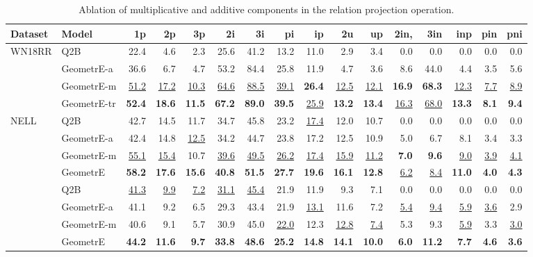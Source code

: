 \documentclass[runningheads]{llncs}
\newcommand{\f}[1]{\textbf{#1}}
\newcommand{\s}[1]{\underline{#1}}
\newcommand{\method}{GeometrE}
\begin{document}
\begin{table}[tbp]
  \centering
  \caption{Ablation of multiplicative and additive components in the
    relation projection operation.}
\begin{adjustbox}{width=0.99\textwidth}
  \begin{tabular}{llrrrrrrrrrrrrrr}
    \toprule
    Dataset                 & Model            &1p          &2p          &3p          & 2i & 3i & pi & ip          & 2u & up & 2in, &3in & inp & pin & pni\\
    \midrule
    \multirow{4}{*}{WN18RR} & Q2B & 22.4 & 4.6 & 2.3 & 25.6 & 41.2 & 13.2 & 11.0 & 2.9 & 3.4 & 0.0 & 0.0 & 0.0 & 0.0 & 0.0 \\
                            & \method{}-a & 36.6 & 6.7 & 4.7 & 53.2 & 84.4 & 25.8 & 11.9 & 4.7 & 3.6 & 8.6 & 44.0 & 4.4 & 3.5 & 5.6 \\
                            & \method{}-m & \s{51.2} & \s{17.2} & \s{10.3} & \s{64.6} & \s{88.5} & \s{39.1} & \f{26.4} & \s{12.5} & \s{12.1} & \f{16.9} & \f{68.3} & \s{12.3} & \s{7.7} & \s{8.9} \\
                            & \method{}-tr & \f{52.4} & \f{18.6} & \f{11.5} & \f{67.2} & \f{89.0} & \f{39.5} & \s{25.9} & \f{13.2} & \f{13.4} & \s{16.3} & \s{68.0} & \f{13.3} & \f{8.1} & \f{9.4} \\
    \midrule
    \multirow{5}{*}{NELL} & Q2B & 42.7 & 14.5 & 11.7 & 34.7 & 45.8 & 23.2 & \s{17.4} & 12.0 & 10.7 & 0.0 & 0.0 & 0.0 & 0.0 & 0.0 \\
                            & \method{}-a & 42.4 & 14.8 & \s{12.5} & 34.2 & 44.7 & 23.8 & 17.2 & 12.5 & 10.9 & 5.0 & 6.7 & 8.1 & 3.4 & 3.3 \\
                            & \method{}-m & \s{55.1} & \s{15.4} & 10.7 & \s{39.6} & \s{49.5} & \s{26.2} & \s{17.4} & \s{15.9} & \s{11.2} & \f{7.0} & \f{9.6} & \s{9.0} & \s{3.9} & \s{4.1} \\
                            & \method{} & \f{58.2} & \f{17.6} & \f{15.6} & \f{40.8} & \f{51.5} & \f{27.7} & \f{19.6} & \f{16.1} & \f{12.8} & \s{6.2} & \s{8.4} & \f{11.0} & \f{4.0} & \f{4.3} \\
    \midrule
    \multirow{5}{*}{FB237}  & Q2B & \s{41.3} & \s{9.9} & \s{7.2} & \s{31.1} & \s{45.4} & 21.9 & 11.9 & 9.3 & 7.1 & 0.0 & 0.0 & 0.0 & 0.0 & 0.0 \\
                            & \method{}-a & 41.1 & 9.2 & 6.5 & 29.3 & 43.4 & 21.9 & \s{13.1} & 11.6 & 7.2 & \s{5.4} & \s{9.4} & \s{5.9} & \s{3.6} & 2.9 \\
                            & \method{}-m & 40.6 & 9.1 & 5.7 & 30.9 & 45.0 & \s{22.0} & 12.3 & \s{12.8} & \s{7.4} & 5.3 & 9.3 & \s{5.9} & 3.3 & \s{3.0} \\
                            & \method{} & \f{44.2} & \f{11.6} & \f{9.7} & \f{33.8} & \f{48.6} & \f{25.2} & \f{14.8} & \f{14.1} & \f{10.0} & \f{6.0} & \f{11.2} & \f{7.7} & \f{4.6} & \f{3.6} \\

    

    
    \bottomrule
  \end{tabular}
  \end{adjustbox}
  \label{tab:ablation}
\end{table}
\end{document}
